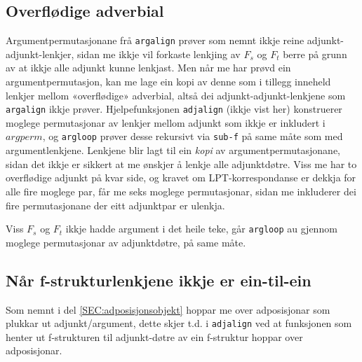 \documentclass[12pt,a4paper,oneside,draft]{report}
\begin{document}
\subsection{Overflødige adverbial}
\label{sec-4.1.1}

   \label{SEC:impl-adjalign}

Argumentpermutasjonane frå \texttt{argalign} prøver som nemnt ikkje reine
adjunkt-adjunkt-lenkjer, sidan me ikkje vil forkaste lenkjing av $F_s$
og $F_t$ berre på grunn av at ikkje alle adjunkt kunne lenkjast. Men
når me har prøvd ein argumentpermutasjon, kan me lage ein kopi av
denne som i tillegg inneheld lenkjer mellom «overflødige» adverbial,
altså dei adjunkt-adjunkt-lenkjene som \texttt{argalign} ikkje
prøver. Hjelpefunksjonen \texttt{adjalign} (ikkje vist her) konstruerer
moglege permutasjonar av lenkjer mellom adjunkt som ikkje er inkludert
i $argperm$, og \texttt{argloop} prøver desse rekursivt via \texttt{sub-f} på same
måte som med argumentlenkjene. Lenkjene blir lagt til ein \emph{kopi} av
argumentpermutasjonane, sidan det ikkje er sikkert at me ønskjer å
lenkje alle adjunktdøtre. Viss me har to overflødige adjunkt på kvar
side, og kravet om LPT-korrespondanse er dekkja for alle fire moglege
par, får me seks moglege permutasjonar, sidan me inkluderer dei fire
permutasjonane der eitt adjunktpar er ulenkja.

Viss $F_s$ og $F_t$ ikkje hadde argument i det heile teke, går
\texttt{argloop} au gjennom moglege permutasjonar av adjunktdøtre, på same
måte.
\subsection{Når f-strukturlenkjene ikkje er ein-til-ein}
\label{sec-4.1.2}

Som nemnt i del \ref{SEC:adposisjonsobjekt} hoppar me over
 adposisjonar som plukkar ut adjunkt/argument, dette skjer t.d. i
 \texttt{adjalign} ved at funksjonen som henter ut f-strukturen til
 adjunkt-døtre av ein f-struktur hoppar over adposisjonar.
\end{document}
